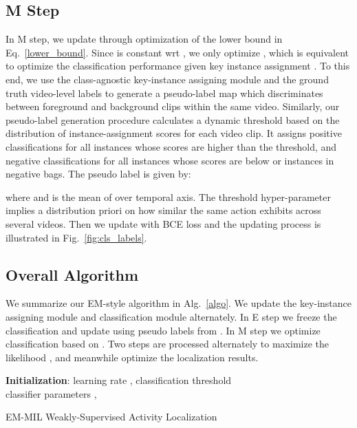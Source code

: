 \documentclass[runningheads]{llncs}
\begin{document}
\subsection{M Step}\label{M}

In M step, we update  through optimization of the lower bound in Eq.~\ref{lower_bound}. Since  is constant wrt , we only optimize , which is equivalent to optimize the classification performance given key instance assignment . To this end, we use the class-agnostic key-instance assigning module  and the ground truth video-level labels to generate a  pseudo-label map which discriminates between foreground and background clips within the same video. Similarly, our pseudo-label generation procedure calculates a dynamic threshold based on the distribution of instance-assignment scores for each video clip. It assigns positive classifications for all instances whose scores are higher than the threshold, and negative classifications for all instances whose scores are below or instances in negative bags. The pseudo label is given by:
  

where  and  is the mean of  over temporal axis. The threshold hyper-parameter  implies a distribution priori on how similar the same action exhibits across several videos. Then we update  with BCE loss and the updating process is illustrated in Fig.~\ref{fig:cls_labels}.



\subsection{Overall Algorithm}

We summarize our EM-style algorithm in Alg.~\ref{algo}. We update the key-instance assigning module  and classification module  alternately. In E step we freeze the classification  and update  using pseudo labels from . In M step we optimize classification based on . Two steps are processed alternately to maximize the likelihood , and meanwhile optimize the localization results. 
\smallskip

\begin{algorithm}[H]
\label{algo}
\SetAlgoLined
 \textbf{Initialization}: learning rate , classification threshold \\ 
 classifier parameters ,  \ \\
 \caption{EM-MIL Weakly-Supervised Activity Localization}
\end{algorithm}
\end{document}
